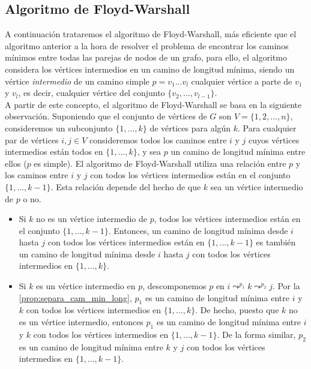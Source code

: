 \subsection{Algoritmo de Floyd-Warshall}\label{Floyd-Warshall}

A continuación trataremos el algoritmo de Floyd-Warshall, más eficiente que el algoritmo anterior a la hora de resolver el problema de encontrar los caminos mínimos entre todas las parejas de nodos de un grafo, para ello, el algoritmo considera los vértices intermedios en un camino de longitud mínima, siendo un vértice \textit{intermedio} de un camino simple $p=v_1...v_l$ cualquier vértice a parte de $v_1$ y $v_l$, es decir, cualquier vértice del conjunto $\{v_2,...,v_{l-1}\}$. \\

A partir de este concepto, el algoritmo de Floyd-Warshall se basa en la siguiente observación. Suponiendo que el conjunto de vértices de $G$ son $V=\{1,2,...,n\}$, consideremos un subconjunto $\{1,...,k\}$ de vértices para algún $k$. Para cualquier par de vértices $i,j\in V$ consideremos todos los caminos entre $i$ y $j$ cuyos vértices intermedios están todos en $\{1,...,k\}$, y sea $p$ un camino de longitud mínima entre ellos ($p$ es simple). El algoritmo de Floyd-Warshall utiliza una relación entre $p$ y los caminos entre $i$ y $j$ con todos los vértices intermedios están en el conjunto $\{1,...,k-1\}$. Esta relación depende del hecho de que $k$ sea un vértice intermedio de $p$ o no.

\begin{itemize}
	\item Si $k$ no es un vértice intermedio de $p$, todos los vértices intermedios están en el conjunto $\{1,...,k-1\}$. Entonces, un camino de longitud mínima desde $i$ hasta $j$ con todos los vértices intermedios están en $\{1,...,k-1\}$ es también un camino de longitud mínima desde $i$ hasta $j$ con todos los vértices intermedios en $\{1,...,k\}$.
	\item Si $k$ es un vértice intermedio en $p$, descomponemos $p$ en $i\leadsto^{p_1}k\leadsto^{p_2}j$. Por la \autoref{prop:separa_cam_min_long}, $p_1$ es un camino de longitud mínima entre $i$ y $k$ con todos los vértices intermedios en $\{1,...,k\}$. De hecho, puesto que $k$ no es un vértice intermedio, entonces $p_1$ es un camino de longitud mínima entre $i$ y $k$ con todos los vértices intermedios en $\{1,...,k-1\}$. De la forma similar, $p_2$ es un camino de longitud mínima entre $k$ y $j$ con todos los vértices intermedios en $\{1,...,k-1\}$.
\end{itemize}

